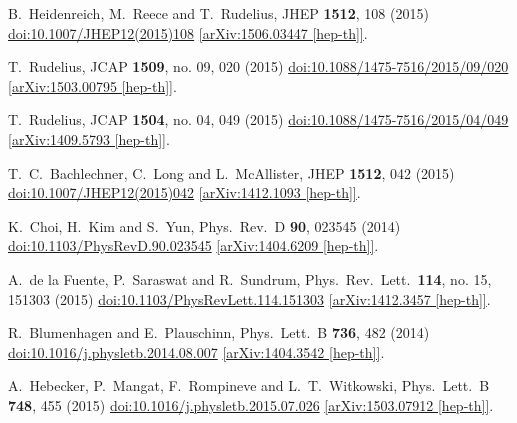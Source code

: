 \documentclass[11pt]{article}
\begin{document}
\begin{thebibliography}{99}
  B.~Heidenreich, M.~Reece and T.~Rudelius,
  JHEP {\bf 1512}, 108 (2015)
  \href{https://dx.doi.org/10.1007/JHEP12(2015)108}{doi:10.1007/JHEP12(2015)108}
  \href{https://arxiv.org/abs/1506.03447}{[arXiv:1506.03447 [hep-th]]}.

  T.~Rudelius,
  JCAP {\bf 1509}, no. 09, 020 (2015)
  \href{https://dx.doi.org/10.1088/1475-7516/2015/09/020}{doi:10.1088/1475-7516/2015/09/020}
  \href{https://arxiv.org/abs/1503.00795}{[arXiv:1503.00795 [hep-th]]}.

  T.~Rudelius,
  JCAP {\bf 1504}, no. 04, 049 (2015)
  \href{https://dx.doi.org/10.1088/1475-7516/2015/04/049}{doi:10.1088/1475-7516/2015/04/049}
  \href{https://arxiv.org/abs/1409.5793}{[arXiv:1409.5793 [hep-th]]}.

  T.~C.~Bachlechner, C.~Long and L.~McAllister,
  JHEP {\bf 1512}, 042 (2015)
  \href{https://dx.doi.org/10.1007/JHEP12(2015)042}{doi:10.1007/JHEP12(2015)042}
  \href{https://arxiv.org/abs/1412.1093}{[arXiv:1412.1093 [hep-th]]}.

  K.~Choi, H.~Kim and S.~Yun,
  Phys.\ Rev.\ D {\bf 90}, 023545 (2014)
  \href{https://dx.doi.org/10.1103/PhysRevD.90.023545}{doi:10.1103/PhysRevD.90.023545}
  \href{https://arxiv.org/abs/1404.6209}{[arXiv:1404.6209 [hep-th]]}.

  A.~de la Fuente, P.~Saraswat and R.~Sundrum,
  Phys.\ Rev.\ Lett.\  {\bf 114}, no. 15, 151303 (2015)
  \href{https://dx.doi.org/10.1103/PhysRevLett.114.151303}{doi:10.1103/PhysRevLett.114.151303}
  \href{https://arxiv.org/abs/1412.3457}{[arXiv:1412.3457 [hep-th]]}.

  R.~Blumenhagen and E.~Plauschinn,
  Phys.\ Lett.\ B {\bf 736}, 482 (2014)
  \href{https://dx.doi.org/10.1016/j.physletb.2014.08.007}{doi:10.1016/j.physletb.2014.08.007}
  \href{https://arxiv.org/abs/1404.3542}{[arXiv:1404.3542 [hep-th]]}.

  A.~Hebecker, P.~Mangat, F.~Rompineve and L.~T.~Witkowski,
  Phys.\ Lett.\ B {\bf 748}, 455 (2015)
  \href{https://dx.doi.org/10.1016/j.physletb.2015.07.026}{doi:10.1016/j.physletb.2015.07.026}
  \href{https://arxiv.org/abs/1503.07912}{[arXiv:1503.07912 [hep-th]]}.


\end{thebibliography}
\end{document}
